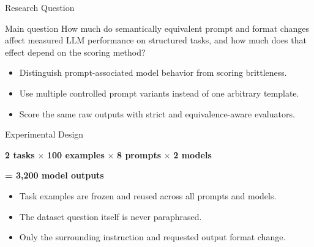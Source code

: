 \documentclass[aspectratio=169,11pt]{beamer}
\newcommand{\smallgap}{\vspace{0.35em}}
\begin{document}
\begin{frame}{Research Question}
  \begin{block}{Main question}
    How much do semantically equivalent prompt and format changes affect measured LLM performance on structured tasks, and how much does that effect depend on the scoring method?
  \end{block}

  \smallgap
  \begin{itemize}
    \item Distinguish prompt-associated model behavior from scoring brittleness.
    \item Use multiple controlled prompt variants instead of one arbitrary template.
    \item Score the same raw outputs with strict and equivalence-aware evaluators.
  \end{itemize}
\end{frame}

\begin{frame}{Experimental Design}
  \begin{center}
    \Large
    \textbf{2 tasks} $\times$ \textbf{100 examples} $\times$ \textbf{8 prompts} $\times$ \textbf{2 models}

    \vspace{0.6em}
    \textbf{= 3,200 model outputs}
  \end{center}

  \vspace{0.8em}
  \begin{itemize}
    \item Task examples are frozen and reused across all prompts and models.
    \item The dataset question itself is never paraphrased.
    \item Only the surrounding instruction and requested output format change.
  \end{itemize}
\end{frame}
\end{document}
